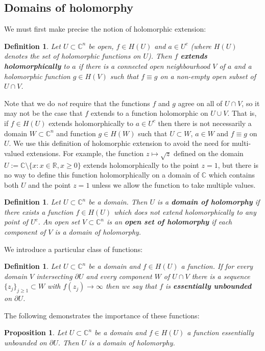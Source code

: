 \documentclass[11pt,a4paper, final, twoside]{article}
\newtheorem{definition}[theorem]{Definition}
\newtheorem{proposition}[theorem]{Proposition}
\numberwithin{equation}{section}
\newcommand{\C}{\mathbb C}
\newcommand{\R}{\mathbb R}
\newcommand{\bd}{\partial}
\newcommand{\hol}{H}
\begin{document}
\subsection{Domains of holomorphy}
We must first make precise the notion of holomorphic extension:
\begin{definition}
Let $U\subset\C^n$ be open, $f\in \hol(U)$ and $a\in U^c$ (where $\hol(U)$ denotes the set of holomorphic functions on $U$). Then $f$ \textbf{extends holomorphically} to $a$ if there is a connected open neighbourhood $V$ of $a$ and a holomorphic function $g\in H(V)$
such that $f\equiv g$ on a non-empty open subset of $U\cap V$.
\end{definition}
Note that we do \emph{not} require that the functions $f$ and $g$ agree on all of $U\cap V$, so it may not be the case that $f$ extends to a function holomorphic on $U\cup V$.
That is, if $f\in \hol(U)$ extends holomorphically to $a\in U^c$ then there is not necessarily a domain $W\subset\C^n$ and function $g\in H(W)$ such that $U\subset W$, $a\in W$ and $f\equiv g$ on $U$.
We use this definition of holomorphic extension to avoid the need for multi-valued extensions. For example, the function $z\mapsto \sqrt{z}$
defined on the domain $U:=\C\setminus\{x\colon x\in\R,x\geq 0\}$ extends holomorphically to the point $z=1$, but there is no way to define this function holomorphically on a domain of $\C$ which
contains both $U$ and the point $z=1$ unless we allow the function to take multiple values. 
\begin{definition}
Let $U\subset\C^n$ be a domain. Then $U$ is a \textbf{domain of holomorphy} if there exists a function $f\in \hol(U)$ which does not extend holomorphically to any point of $U^c$.
An open set $V\subset\C^n$ is an \textbf{open set of holomorphy} if each component of $V$ is a domain of holomorphy.
\end{definition}
We introduce a particular class of functions:
\begin{definition}
Let $U\subset\C^n$ be a domain and $f\in\hol(U)$ a function.
If for every domain $V$ intersecting $\bd U$ and every component $W$ of $U\cap V$
there is a sequence $\{z_j\}_{j\geq 1}\subset W$ with $f(z_j)\to\infty$ then we say that $f$ is \textbf{essentially unbounded} on $\bd U$.
\end{definition}
The following demonstrates the importance of these functions:
\begin{proposition}
\label{unbdedhol}
Let $U\subset\C^n$ be a domain and $f\in \hol(U)$ a function essentially unbounded on $\bd U$. Then $U$ is a domain of holomorphy.
\end{proposition}
\end{document}

